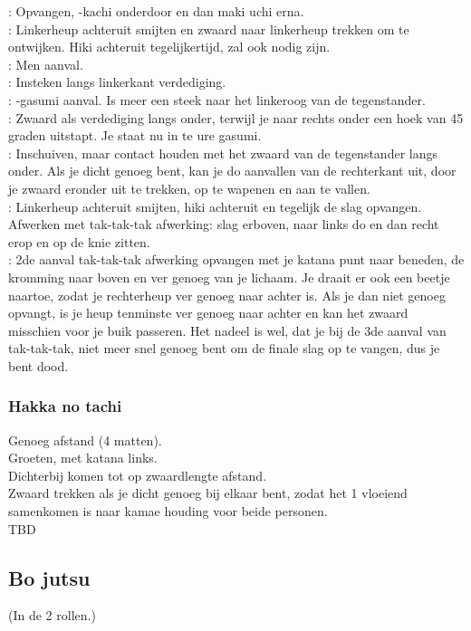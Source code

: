 \pA: Opvangen, -kachi onderdoor en dan maki uchi erna.\\
\pB: Linkerheup achteruit smijten en zwaard naar linkerheup trekken om te ontwijken. Hiki achteruit tegelijkertijd, zal ook nodig zijn.\\
\pA: Men aanval.\\
\pB: Insteken langs linkerkant verdediging.\\
\pA: -gasumi aanval. Is meer een steek naar het linkeroog van de tegenstander.\\
\pB: Zwaard als verdediging langs onder, terwijl je naar rechts onder een hoek van 45 graden uitstapt. Je staat nu in te ure gasumi.\\
\pB: Inschuiven, maar contact houden met het zwaard van de tegenstander langs onder. Als je dicht genoeg bent, kan je do aanvallen van de rechterkant uit, door je zwaard eronder uit te trekken, op te wapenen en aan te vallen.\\
\pA: Linkerheup achteruit smijten, hiki achteruit en tegelijk de slag opvangen. Afwerken met tak-tak-tak afwerking: slag erboven, naar links do en dan recht erop en op de knie zitten.\\
\pB: 2de aanval tak-tak-tak afwerking opvangen met je katana punt naar beneden, de kromming naar boven en ver genoeg van je lichaam. Je draait er ook een beetje naartoe, zodat je rechterheup ver genoeg naar achter is. Als je dan niet genoeg opvangt, is je heup tenminste ver genoeg naar achter en kan het zwaard misschien voor je buik passeren. Het nadeel is wel, dat je bij de 3de aanval van tak-tak-tak, niet meer snel genoeg bent om de finale slag op te vangen, dus je bent dood.

\subsubsection{Hakka no tachi}

Genoeg afstand (4 matten).\\
Groeten, met katana links.\\
Dichterbij komen tot op zwaardlengte afstand.\\
Zwaard trekken als je dicht genoeg bij elkaar bent, zodat het 1 vloeiend samenkomen is naar kamae houding voor beide personen.\\
TBD

\subsection{Bo jutsu}
(In de 2 rollen.)

